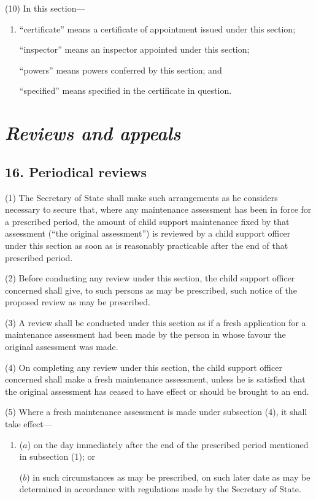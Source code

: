 \documentclass[12pt,a4paper]{article}
\begin{document}
(10) In this section—
\begin{enumerate}\item[]
    “certificate” means a certificate of appointment issued under this section;

    “inspector” means an inspector appointed under this section;

    “powers” means powers conferred by this section; and

    “specified” means specified in the certificate in question. 
\end{enumerate}


\section{\itshape Reviews and appeals}

\subsection{16. Periodical reviews}

(1) The Secretary of State shall make such arrangements as he considers necessary to secure that, where any maintenance assessment has been in force for a prescribed period, the amount of child support maintenance fixed by that assessment (“the original assessment”) is reviewed by a child support officer under this section as soon as is reasonably practicable after the end of that prescribed period.

(2) Before conducting any review under this section, the child support officer concerned shall give, to such persons as may be prescribed, such notice of the proposed review as may be prescribed.

(3) A review shall be conducted under this section as if a fresh application for a maintenance assessment had been made by the person in whose favour the original assessment was made.

(4) On completing any review under this section, the child support officer concerned shall make a fresh maintenance assessment, unless he is satisfied that the original assessment has ceased to have effect or should be brought to an end.

(5) Where a fresh maintenance assessment is made under subsection (4), it shall take effect—
\begin{enumerate}\item[]
($a$) on the day immediately after the end of the prescribed period mentioned in subsection (1); or

($b$) in such circumstances as may be prescribed, on such later date as may be determined in accordance with regulations made by the Secretary of State.
\end{enumerate}
\end{document}

